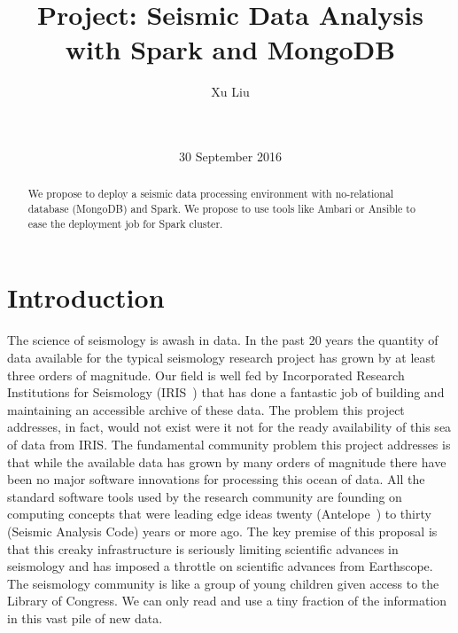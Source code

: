 \documentclass{acm_proc_article-sp}
\begin{document}
\title{Project: Seismic Data Analysis with Spark and MongoDB}

\author{
\alignauthor
Xu Liu\\
       \\
       \\
}

\date{30 September 2016}


\maketitle
\begin{abstract}
We propose to deploy a seismic data processing environment with no-relational database (MongoDB) and Spark. We propose to use tools like Ambari or Ansible to ease the deployment job for Spark cluster.
\end{abstract}


\section{Introduction}

The science of seismology is awash in data. In the past 20 years the quantity of data available for the typical seismology research project has grown by at least three orders of magnitude.  Our field is well fed by Incorporated Research Institutions for Seismology (IRIS~\cite{IRIS}) that has done a fantastic job of building and maintaining an accessible archive of these data.  The problem this project addresses, in fact, would not exist were it not for the ready availability of this sea of data from IRIS.  The fundamental community problem this project addresses is that while the available data has grown by many orders of magnitude there have been no major software innovations for processing this ocean of data.  All the standard software tools used by the research community are founding on computing concepts that were leading edge ideas twenty (Antelope~\cite{Antelope}) to thirty (Seismic Analysis Code) years or more ago.  The key premise of this proposal is that this creaky infrastructure is seriously limiting scientific advances in seismology and has imposed a throttle on scientific advances from Earthscope.  The seismology community is like a group of young children given access to the Library of Congress.  We can only read and use a tiny fraction of the information in this vast pile of new data.  
\end{document}
